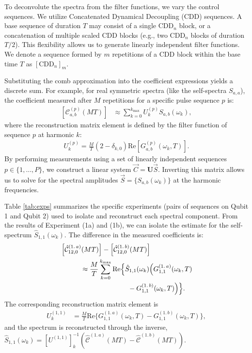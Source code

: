 \documentclass[%
 reprint,
superscriptaddress,
 amsmath,amssymb,
 aps,
pra,
floatfix,
]{revtex4-2}
\begin{document}
To deconvolute the spectra from the filter functions, we vary the control sequences. We utilize Concatenated Dynamical Decoupling (CDD) sequences. A base sequence of duration $T$ may consist of a single $\text{CDD}_n$ block, or a concatenation of multiple scaled CDD blocks (e.g., two $\text{CDD}_n$ blocks of duration $T/2$). This flexibility allows us to generate linearly independent filter functions. We denote a sequence formed by $m$ repetitions of a CDD block within the base time $T$ as $[\text{CDD}_n]_m$.

Substituting the comb approximation into the coefficient expressions yields a discrete sum. For example, for real symmetric spectra (like the self-spectra $S_{a,a}$), the coefficient measured after $M$ repetitions for a specific pulse sequence $p$ is:
\begin{align}
\label{eq::gencoeff}
    \left[\mathcal{C}^{(p)}_{a,b}(MT)\right]&\approx \sum_{k=0}^{k_\text{max}} U^{(p)}_{k} S_{a,b}(\omega_k),
\end{align}
where the reconstruction matrix element is defined by the filter function of sequence $p$ at harmonic $k$:
\begin{align}
    U^{(p)}_{k}=\frac{M}{T}(2-\delta_{k,0})\text{Re}\left[G^{(p)}_{a,b}(\omega_k,T)\right].
\end{align}
By performing measurements using a set of linearly independent sequences $p \in \{1, \dots, P\}$, we construct a linear system $\vec{C} = \mathbf{U} \vec{S}$. Inverting this matrix allows us to solve for the spectral amplitudes $\vec{S} = \{S_{a,b}(\omega_k)\}$ at the harmonic frequencies. 

Table \ref{tab:exps} summarizes the specific experiments (pairs of sequences on Qubit 1 and Qubit 2) used to isolate and reconstruct each spectral component. From the results of Experiment (1a) and (1b), we can isolate the estimate for the self-spectrum $\hat{S}_{1,1}(\omega_k)$. The difference in the measured coefficients is:
\begin{align}
    &\left[\hat{\mathcal{C}}_{12,0}^{(1.\,a)}(MT)\right]-\left[\hat{\mathcal{C}}_{12,0}^{(1.\,b)}(MT)\right]\notag\\
    &\qquad\quad\approx\frac{M}{T}\sum_{k=0}^{k_{\max}}\text{Re}\Big\{\hat{S}_{1,1}(\omega_k)\Big(G_{1,1}^{(1.\,a)}(\omega_k, T) \notag\\
    &\qquad\qquad\qquad\qquad\qquad- G_{1,1}^{(1.\,b)}(\omega_k, T)\Big)\Big\}.
\end{align}
The corresponding reconstruction matrix element is
\begin{align}
    U_{k}^{(1,1)}&=\frac{M}{T}\text{Re}\Big\{G_{1,1}^{(1.\,a)}(\omega_k, T) - G_{1,1}^{(1.\,b)}(\omega_k, T)\Big\},
\end{align}
and the spectrum is reconstructed through the inverse, $\hat{S}_{1,1}(\omega_k) = [U^{(1,1)}]^{-1}_{k} (\hat{\mathcal{C}}^{(1.\,a)}(MT) - \hat{\mathcal{C}}^{(1.\,b)}(MT))$.
\end{document}
